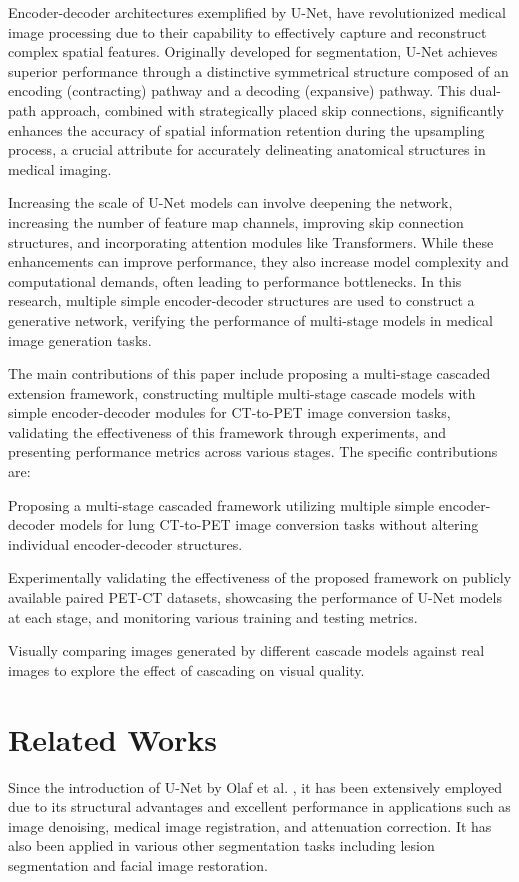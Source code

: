 \documentclass[a4paper, times, 10pt,twocolumn]{article}
\begin{document}
Encoder-decoder architectures exemplified by U-Net, have revolutionized medical image processing due to their capability to effectively capture and reconstruct complex spatial features. Originally developed for segmentation, U-Net achieves superior performance through a distinctive symmetrical structure composed of an encoding (contracting) pathway and a decoding (expansive) pathway. This dual-path approach, combined with strategically placed skip connections, significantly enhances the accuracy of spatial information retention during the upsampling process, a crucial attribute for accurately delineating anatomical structures in medical imaging.

Increasing the scale of U-Net models can involve deepening the network, increasing the number of feature map channels, improving skip connection structures, and incorporating attention modules like Transformers. While these enhancements can improve performance, they also increase model complexity and computational demands, often leading to performance bottlenecks. In this research, multiple simple encoder-decoder structures are used to construct a generative network, verifying the performance of multi-stage models in medical image generation tasks.

The main contributions of this paper include proposing a multi-stage cascaded extension framework, constructing multiple multi-stage cascade models with simple encoder-decoder modules for CT-to-PET image conversion tasks, validating the effectiveness of this framework through experiments, and presenting performance metrics across various stages. The specific contributions are:

Proposing a multi-stage cascaded framework utilizing multiple simple encoder-decoder models for lung CT-to-PET image conversion tasks without altering individual encoder-decoder structures.

Experimentally validating the effectiveness of the proposed framework on publicly available paired PET-CT datasets, showcasing the performance of U-Net models at each stage, and monitoring various training and testing metrics.

Visually comparing images generated by different cascade models against real images to explore the effect of cascading on visual quality.

\section{Related Works}
Since the introduction of U-Net by Olaf et al. \cite{navab_u-net_2015}, it has been extensively employed due to its structural advantages and excellent performance in applications such as image denoising, medical image registration, and attenuation correction. It has also been applied in various other segmentation tasks including lesion segmentation and facial image restoration.
\end{document}
